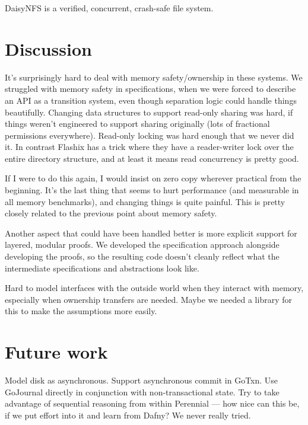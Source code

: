 DaisyNFS is a verified, concurrent, crash-safe file system.

\section{Discussion}

It's surprisingly hard to deal with memory safety/ownership in these systems. We
struggled with memory safety in specifications, when we were forced to describe
an API as a transition system, even though separation logic could handle things
beautifully. Changing data structures to support read-only sharing was hard, if
things weren't engineered to support sharing originally (lots of fractional
permissions everywhere). Read-only locking was hard enough that we never did it.
In contrast Flashix has a trick where they have a reader-writer lock over the
entire directory structure, and at least it means read concurrency is pretty
good.

If I were to do this again, I would insist on zero copy wherever practical from
the beginning. It's the last thing that seems to hurt performance (and
measurable in all memory benchmarks), and changing things is quite painful. This
is pretty closely related to the previous point about memory safety.

Another aspect that could have been handled better is more explicit support for
layered, modular proofs. We developed the specification approach alongside
developing the proofs, so the resulting code doesn't cleanly reflect what the
intermediate specifications and abstractions look like.

Hard to model interfaces with the outside world when they interact with memory,
especially when ownership transfers are needed. Maybe we needed a library for
this to make the assumptions more easily.


\resume

\section{Future work}

Model disk as asynchronous. Support asynchronous commit in GoTxn.  Use GoJournal
directly in conjunction with non-transactional state. Try to take advantage of
sequential reasoning from within Perennial --- how nice can this be, if we put
effort into it and learn from Dafny? We never really tried.


